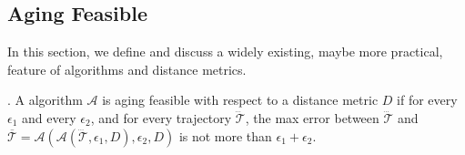 \subsection{Aging Feasible}
In this section, we define and discuss a widely existing, maybe more practical, feature of \lsa algorithms and distance metrics.

. {A \lsa algorithm $\mathcal{A}$ is aging feasible with respect to a distance metric $D$ if for every $\epsilon_1$ and every $\epsilon_2$, and for every trajectory $\dddot{\mathcal{T}}$, the max error between $\dddot{\mathcal{T}}$ and $\overline{\mathcal{T}}=\mathcal{A}(\mathcal{A}(\dddot{\mathcal{T}}, \epsilon_1, D), \epsilon_2, D)$ is not more than $\epsilon_1+ \epsilon_2$.}



